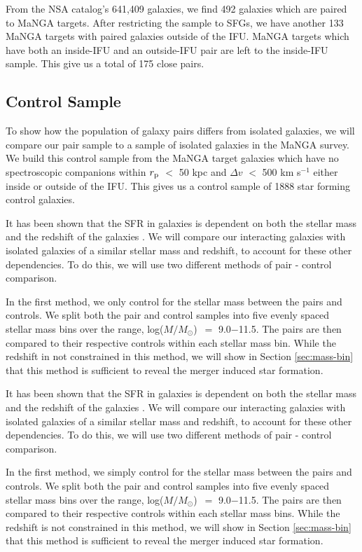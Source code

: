 \documentclass[iop,revtex4,twocolumn,apj,numberedappendix,appendixfloats]{emulateapj}
\newcommand{\logm}{log($M/M_{\odot}$)}
\begin{document}
From the NSA catalog's 641,409 galaxies, we find 492 galaxies which are paired to MaNGA targets. After restricting the sample to SFGs, we have another 133 MaNGA targets with paired galaxies outside of the IFU. MaNGA targets which have both an inside-IFU and an outside-IFU pair are left to the inside-IFU sample. This give us a total of 175 close pairs.

\subsection{Control Sample}\label{sec:control}

To show how the population of galaxy pairs differs from isolated galaxies, we will compare our pair sample to a sample of isolated galaxies in the MaNGA survey. We build this control sample from the MaNGA target galaxies which have no spectroscopic companions within $r_{\rm p}$ $<$ 50 kpc and $\Delta v$ $<$ 500 km s$^{-1}$ either inside or outside of the IFU. This gives us a control sample of 1888 star forming control galaxies. 

It has been shown that the SFR in galaxies is dependent on both the stellar mass and the redshift of the galaxies \citep{Noeske:2007}. We will compare our interacting galaxies with isolated galaxies of a similar stellar mass and redshift, to account for these other dependencies. To do this, we will use two different methods of pair - control comparison. 

In the first method, we only control for the stellar mass between the pairs and controls. We split both the pair and control samples into five evenly spaced stellar mass bins over the range, \logm\ $=$ 9.0$-$11.5. The pairs are then compared to their respective controls within each stellar mass bin. While the redshift in not constrained in this method, we will show in Section \ref{sec:mass-bin} that this method is sufficient to reveal the merger induced star formation. 

It has been shown that the SFR in galaxies is dependent on both the stellar mass and the redshift of the galaxies \citep[e.g.,][]{Noeske:2007}. We will compare our interacting galaxies with isolated galaxies of a similar stellar mass and redshift, to account for these other dependencies. To do this, we will use two different methods of pair - control comparison. 

In the first method, we simply control for the stellar mass between the pairs and controls. We split both the pair and control samples into five evenly spaced stellar mass bins over the range, \logm\ $=$ 9.0$-$11.5. The pairs are then compared to their respective controls within each stellar mass bins. While the redshift is not constrained in this method, we will show in Section \ref{sec:mass-bin} that this method is sufficient to reveal the merger induced star formation. 
\end{document}
